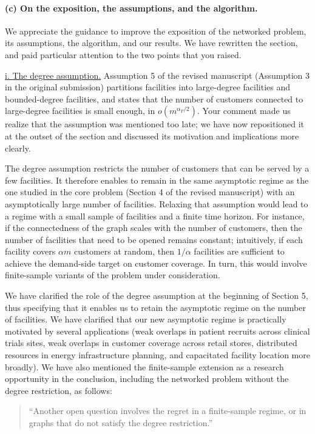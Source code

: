 \documentclass[11pt]{article}
\begin{document}
\paragraph{(c) On the exposition, the assumptions, and the algorithm.}

We appreciate the guidance to improve the exposition of the networked problem, its assumptions, the algorithm, and our results. We have rewritten the section, and paid particular attention to the two points that you raised.

\underline{i. The degree assumption.} Assumption 5 of the revised manuscript (Assumption 3 in the original submission) partitions facilities into large-degree facilities and bounded-degree facilities, and states that the number of customers connected to large-degree facilities is small enough, in $o(m^{\alpha_T/2})$. Your comment made us realize that the assumption was mentioned too late; we have now repositioned it at the outset of the section and discussed its motivation and implications more clearly.

The degree assumption restricts the number of customers that can be served by a few facilities. It therefore enables to remain in the same asymptotic regime as the one studied in the core problem (Section 4 of the revised manuscript) with an asymptotically large number of facilities. Relaxing that assumption would lead to a regime with a small sample of facilities and a finite time horizon. For instance, if the connectedness of the graph scales with the number of customers, then the number of facilities that need to be opened remains constant; intuitively, if each facility covers $\alpha m$ customers at random, then $1/\alpha$ facilities are sufficient to achieve the demand-side target on customer coverage. In turn, this would involve finite-sample variants of the problem under consideration.

We have clarified the role of the degree assumption at the beginning of Section 5, thus specifying that it enables us to retain the asymptotic regime on the number of facilities. We have clarified that our new asymptotic regime is practically motivated by several applications (weak overlaps in patient recruits across clinical trials sites, weak overlaps in customer coverage across retail stores, distributed resources in energy infrastructure planning, and capacitated facility location more broadly). We have also mentioned the finite-sample extension as a research opportunity in the conclusion, including the networked problem without the degree restriction, as follows:
\begin{quote}
    ``Another open question involves the regret in a finite-sample regime, or in graphs that do not satisfy the degree restriction.''
\end{quote}
\end{document}
